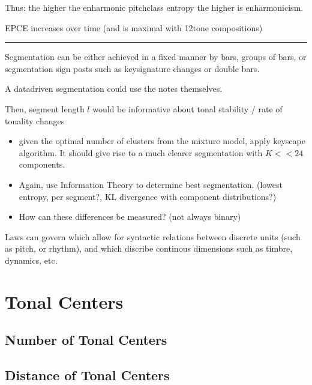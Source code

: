 \documentclass[letterpaper,10pt,english]{sphinxmanual}
\begin{document}
\sphinxAtStartPar
Thus: the higher the enharmonic pitch\sphinxhyphen{}class entropy the higher is
enharmonicism.

\sphinxAtStartPar
{} EPCE increases over time (and is maximal with 12\sphinxhyphen{}tone
compositions)


\bigskip\hrule\bigskip


\sphinxAtStartPar
Segmentation can be either achieved in a fixed manner by bars, groups of
bars, or segmentation sign posts such as key\sphinxhyphen{}signature changes or double
bars.

\sphinxAtStartPar
A data\sphinxhyphen{}driven segmentation could use the notes themselves.

\sphinxAtStartPar
Then, segment length \(l\) would be informative about tonal
stability / rate of tonality changes
\begin{itemize}
\item {} 
\sphinxAtStartPar
given the optimal number of clusters from the mixture model, apply
key\sphinxhyphen{}scape algorithm. It should give rise to a much clearer
segmentation with \(K<<24\) components.

\item {} 
\sphinxAtStartPar
Again, use Information Theory to determine best segmentation. (lowest
entropy, per segment?, KL divergence with component distributions?)

\item {} 
\sphinxAtStartPar
How can these differences be measured? (not always binary)

\end{itemize}

\sphinxAtStartPar
Laws can govern  which allow for syntactic relations
between discrete units (such as pitch, or rhythm), and  which discribe continous dimensions such as timbre,
dynamics, etc.


\section{Tonal Centers}
\label{\detokenize{5_notes:tonal-centers}}

\subsection{Number of Tonal Centers}
\label{\detokenize{5_notes:number-of-tonal-centers}}

\subsection{Distance of Tonal Centers}
\label{\detokenize{5_notes:distance-of-tonal-centers}}
\end{document}
